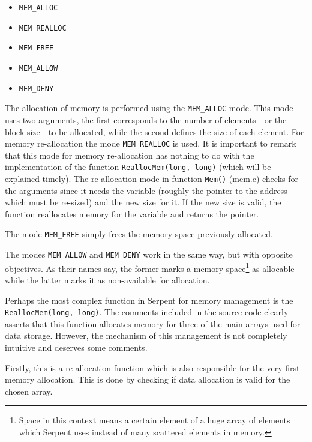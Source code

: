 \documentclass[twoside,a4paper,12pt,english,draft]{anstrans}
\begin{document}
\begin{itemize}
\item \texttt{MEM\_ALLOC}
\item \texttt{MEM\_REALLOC}
\item \texttt{MEM\_FREE}
\item \texttt{MEM\_ALLOW}
\item \texttt{MEM\_DENY}
\end{itemize} 

The allocation of memory is performed using the \texttt{MEM\_ALLOC} mode. This mode uses two arguments, the first
corresponds to the number of elements - or the block size - to be allocated, while the second defines the size of each element.
For memory re-allocation the mode \texttt{MEM\_REALLOC} is used. It is important to remark that this mode for memory re-allocation
has nothing to do with the implementation of the function \texttt{ReallocMem(long, long)} (which will be explained timely). The re-allocation mode
in function \texttt{Mem()} (mem.c) checks for the arguments since it needs the variable (roughly the pointer to the address which must
be re-sized) and the new size for it. If the new size is valid, the function reallocates memory for the variable and returns the pointer.

%

The mode \texttt{MEM\_FREE} simply frees the memory space previously allocated.

The modes \texttt{MEM\_ALLOW} and \texttt{MEM\_DENY} work in the same way, but with opposite objectives. As
their names say, the former marks a memory space\footnote{Space in this context means a certain element of a huge array
of elements which Serpent uses instead of many scattered elements in memory.} as allocable while the latter marks it as non-available
for allocation.

Perhaps the most complex function in Serpent for memory management is the \texttt{ReallocMem(long, long)}.
The comments included in the source code clearly asserts that this function allocates memory for
three of the main arrays used for data storage. However, the mechanism of this management is not
completely intuitive and deserves some comments.

Firstly, this is a re-allocation function which is also responsible for the very first memory
allocation. This is done by checking if data allocation is valid for the chosen array.
\end{document}
